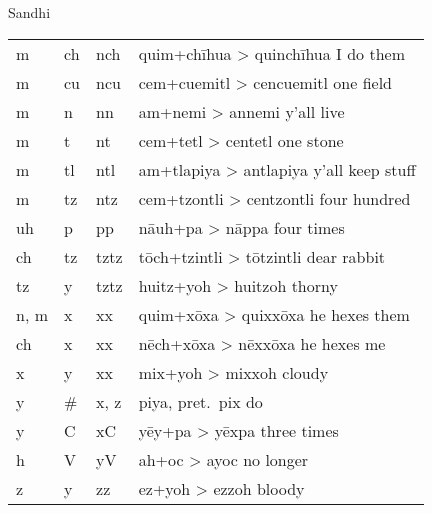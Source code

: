 \documentclass[12pt]{beamer}
\newcommand{\nah}[1]{\textcolor{nahgrn}{#1}}
\newcommand{\trs}[1]{\textcolor{nahblu}{#1}}
\begin{document}
\begin{frame}
\begin{columns}[t]
\begin{column}{.26\linewidth}
\begin{block}{Sandhi}
\begin{threeparttable}
\begin{tabular}{l@{+ }l@{> }ll}
            \nah{m}    & \nah{ch}  & \nah{nch}             & \nah{quim}+\nah{chīhua} > \nah{quinchīhua} \trs{I do them}      \\
            \nah{m}    & \nah{cu}  & \nah{ncu}             & \nah{cem}+\nah{cuemitl} > \nah{cencuemitl} \trs{one field}      \\
            \nah{m}    & \nah{n}   & \nah{nn}              & \nah{am}+\nah{nemi} > \nah{annemi} \trs{y'all live}             \\
            \nah{m}    & \nah{t}   & \nah{nt}              & \nah{cem}+\nah{tetl} > \nah{centetl} \trs{one stone}            \\
            \nah{m}    & \nah{tl}  & \nah{ntl}             & \nah{am}+\nah{tlapiya} > \nah{antlapiya} \trs{y'all keep stuff} \\
            \nah{m}    & \nah{tz}  & \nah{ntz}             & \nah{cem}+\nah{tzontli} > \nah{centzontli} \trs{four hundred}   \\
            \nah{uh}   & \nah{p}   & \nah{pp}              & \nah{nāuh}+\nah{pa} > \nah{nāppa} \trs{four times}              \\
            \nah{ch}   & \nah{tz}  & \nah{tztz}\tnote{1}   & \nah{tōch}+\nah{tzintli} > \nah{tōtzintli} \trs{dear rabbit}    \\
            \nah{tz}   & \nah{y}   & \nah{tztz}\tnote{1}   & \nah{huitz}+\nah{yoh} > \nah{huitzoh} \trs{thorny}              \\
            \nah{n, m} & \nah{x}   & \nah{xx}\tnote{1}     & \nah{quim}+\nah{xōxa} > \nah{quixxōxa} \trs{he hexes them}      \\
            \nah{ch}   & \nah{x}   & \nah{xx}\tnote{1}     & \nah{nēch}+\nah{xōxa} > \nah{nēxxōxa} \trs{he hexes me}         \\
            \nah{x}    & \nah{y}   & \nah{xx}\tnote{1}     & \nah{mix}+\nah{yoh} > \nah{mixxoh} \trs{cloudy}                 \\
            \nah{y}    & \nah{\#}  & \nah{x, z}\tnote{2}{} & \nah{piya}, pret.~\nah{pix} \trs{do}                            \\
            \nah{y}    & \nah{C}   & \nah{xC}              & \nah{yēy}+\nah{pa} > \nah{yēxpa} \trs{three times}              \\
            \nah{h}    & \nah{V}   & \nah{yV}              & \nah{ah}+\nah{oc} > \nah{ayoc} \trs{no longer}                  \\
            \nah{z}    & \nah{y}   & \nah{zz}\tnote{1}     & \nah{ez}+\nah{yoh} > \nah{ezzoh} \trs{bloody}                   \\

\end{tabular}
\end{threeparttable}
\end{block}
\end{column}
\end{columns}
\end{frame}
\end{document}
